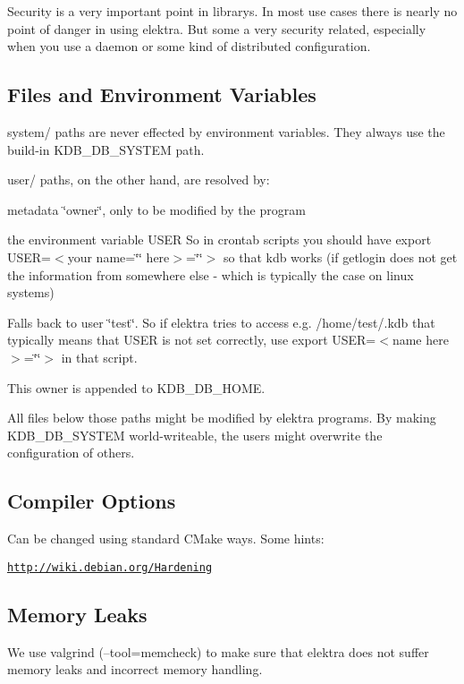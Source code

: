 Security is a very important point in librarys. In most use cases there is nearly no point of danger in using elektra. But some a very security related, especially when you use a daemon or some kind of distributed configuration.

\subsection*{Files and Environment Variables}

system/ paths are never effected by environment variables. They always use the build-\/in K\+D\+B\+\_\+\+D\+B\+\_\+\+S\+Y\+S\+T\+E\+M path.

user/ paths, on the other hand, are resolved by\+:


\begin{DoxyEnumerate}
\item metadata \char`\"{}owner\char`\"{}, only to be modified by the program
\item the environment variable U\+S\+E\+R So in crontab scripts you should have export U\+S\+E\+R=$<$your name=\char`\"{}\char`\"{} here$>$=\char`\"{}\char`\"{}$>$ so that kdb works (if getlogin does not get the information from somewhere else -\/ which is typically the case on linux systems)
\item Falls back to user \char`\"{}test\char`\"{}. So if elektra tries to access e.\+g. /home/test/.kdb that typically means that U\+S\+E\+R is not set correctly, use export U\+S\+E\+R=$<$name here$>$=\char`\"{}\char`\"{}$>$ in that script.
\end{DoxyEnumerate}

This owner is appended to K\+D\+B\+\_\+\+D\+B\+\_\+\+H\+O\+M\+E.

All files below those paths might be modified by elektra programs. By making K\+D\+B\+\_\+\+D\+B\+\_\+\+S\+Y\+S\+T\+E\+M world-\/writeable, the users might overwrite the configuration of others.

\subsection*{Compiler Options}

Can be changed using standard C\+Make ways. Some hints\+:

\href{http://wiki.debian.org/Hardening}{\tt http\+://wiki.\+debian.\+org/\+Hardening}

\subsection*{Memory Leaks}

We use valgrind (--tool=memcheck) to make sure that elektra does not suffer memory leaks and incorrect memory handling. 